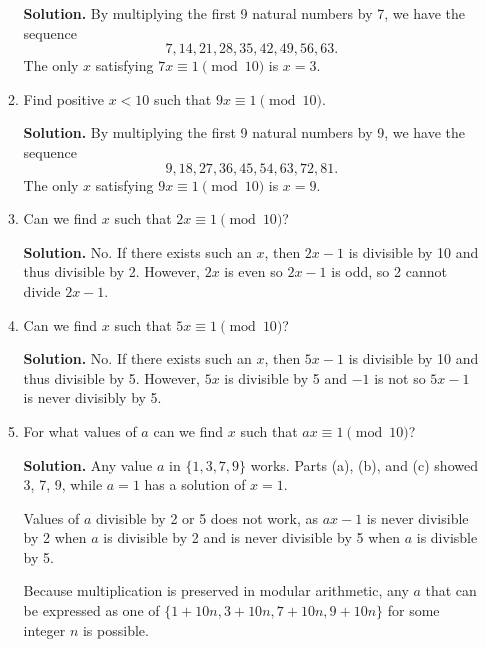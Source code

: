 \documentclass[11pt]{article}
\theoremstyle{definition}
\begin{document}
\begin{enumerate}
\begin{enumerate}
\textbf{Solution.}
By multiplying the first 9 natural numbers by 7, we have the sequence
\[7, 14, 21, 28, 35, 42, 49, 56, 63.\]
The only $x$ satisfying $7x \equiv 1 \pmod{10}$ is $x = 3$.

\item Find positive $x < 10$ such that $9x \equiv 1 \pmod{10}$.

\textbf{Solution.}
By multiplying the first 9 natural numbers by 9, we have the sequence
\[9, 18, 27, 36, 45, 54, 63, 72, 81.\]
The only $x$ satisfying $9x \equiv 1 \pmod{10}$ is $x = 9$.

\item Can we find $x$ such that $2x \equiv 1 \pmod{10}$?

\textbf{Solution.}
No. If there exists such an $x$, then $2x - 1$ is divisible by 10 and thus divisible by 2. However, $2x$ is even so $2x - 1$ is odd, so 2 cannot divide $2x - 1$.

\item Can we find $x$ such that $5x \equiv 1 \pmod{10}$?

\textbf{Solution.}
No. If there exists such an $x$, then $5x - 1$ is divisible by 10 and thus divisible by 5. However, $5x$ is divisible by 5 and $-1$ is not so $5x - 1$ is never divisibly by 5.

\item For what values of $a$ can we find $x$ such that $ax \equiv 1 \pmod{10}$?

\textbf{Solution.}
Any value $a$ in $\{1, 3, 7, 9\}$ works. Parts (a), (b), and (c) showed 3, 7, 9, while $a=1$ has a solution of $x=1$.

Values of $a$ divisible by 2 or 5 does not work, as $ax - 1$ is never divisible by 2 when $a$ is divisible by 2 and is never divisible by 5 when $a$ is divisble by 5.

Because multiplication is preserved in modular arithmetic, any $a$ that can be expressed as one of $\{1+10n, 3+10n, 7+10n, 9+10n\}$ for some integer $n$ is possible.

\end{enumerate}
\end{enumerate}
\end{document}
